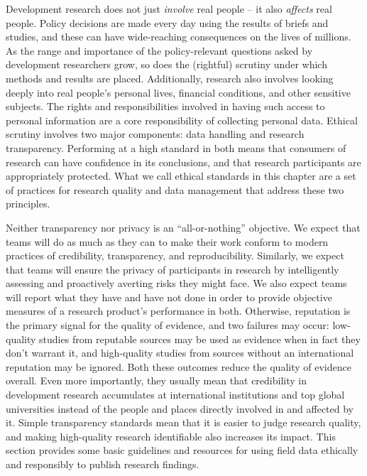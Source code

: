 
\begin{fullwidth}
Development research does not just \textit{involve} real people -- it also \textit{affects} real people.
Policy decisions are made every day using the results of briefs and studies,
and these can have wide-reaching consequences on the lives of millions.
As the range and importance of the policy-relevant questions
asked by development researchers grow,
so does the (rightful) scrutiny under which methods and results are placed.
Additionally, research also involves looking deeply into real people's
personal lives, financial conditions, and other sensitive subjects.
The rights and responsibilities involved in having such access
to personal information are a core responsibility of collecting personal data.
Ethical scrutiny involves two major components: data handling and research transparency.
Performing at a high standard in both means that
consumers of research can have confidence in its conclusions,
and that research participants are appropriately protected.
What we call ethical standards in this chapter are a set of practices
for research quality and data management that address these two principles.

Neither transparency nor privacy is an ``all-or-nothing'' objective.
We expect that teams will do as much as they can to make their work
conform to modern practices of credibility, transparency, and reproducibility.
Similarly, we expect that teams will ensure the privacy of participants in research
by intelligently assessing and proactively averting risks they might face.
We also expect teams will report what they have and have not done
in order to provide objective measures of a research product's performance in both.
Otherwise, reputation is the primary signal for the quality of evidence, and two failures may occur:
low-quality studies from reputable sources may be used as evidence when in fact they don't warrant it,
and high-quality studies from sources without an international reputation may be ignored.
Both these outcomes reduce the quality of evidence overall.
Even more importantly, they usually mean that credibility in development research accumulates at international institutions
and top global universities instead of the people and places directly involved in and affected by it.
Simple transparency standards mean that it is easier to judge research quality,
and making high-quality research identifiable also increases its impact.
This section provides some basic guidelines and resources
for using field data ethically and responsibly to publish research findings.
\end{fullwidth}

